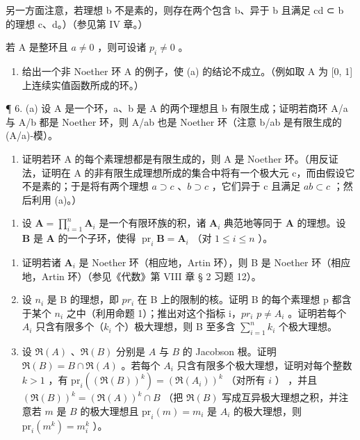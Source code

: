 另一方面注意，若理想 b 不是素的，则存在两个包含 b、异于 b 且满足 cd ⊂ b 的理想 c、d。）（参见第 IV 章。）

若 A 是整环且 \(a \neq 0\) ，则可设诸 \(p_{i} \neq 0\) 。

\begin{enumerate}
\def\labelenumi{(\alph{enumi})}
\setcounter{enumi}{1}
\tightlist
\item
  给出一个非 Noether 环 A 的例子，使 (a) 的结论不成立。（例如取 A 为 {[}0, 1{]} 上连续实值函数所成的环。）
\end{enumerate}

¶ 6. (a) 设 A 是一个环，a、b 是 A 的两个理想且 b 有限生成；证明若商环 A/a 与 A/b 都是 Noether 环，则 A/ab 也是 Noether 环（注意 b/ab 是有限生成的 (A/a)-模）。

\begin{enumerate}
\def\labelenumi{(\alph{enumi})}
\setcounter{enumi}{1}
\tightlist
\item
  证明若环 A 的每个素理想都是有限生成的，则 A 是 Noether 环。（用反证法，证明在 A 的非有限生成理想所成的集合中将有一个极大元 c，而由假设它不是素的；于是将有两个理想 \(a \supset c\) 、\(b \supset c\) ，它们异于 c 且满足 \(ab \subset c\) ；然后利用 (a)。）
\end{enumerate}

\begin{enumerate}
\def\labelenumi{\arabic{enumi}.}
\setcounter{enumi}{6}
\tightlist
\item
  设 \(\mathbf{A} = \prod_{i=1}^{n} \mathbf{A}_i\) 是一个有限环族的积，诸 \(\mathbf{A}_i\) 典范地等同于 \(\mathbf{A}\) 的理想。设 \(\mathbf{B}\) 是 \(\mathbf{A}\) 的一个子环，使得 \(\operatorname{pr}_i \mathbf{B} = \mathbf{A}_i\) （对 \(1 \leqslant i \leqslant n\) ）。
\end{enumerate}

\begin{enumerate}
\def\labelenumi{(\alph{enumi})}
\item
  证明若诸 \(\mathbf{A}_i\) 是 Noether 环（相应地，Artin 环），则 B 是 Noether 环（相应地，Artin 环）（参见《代数》第 VIII 章 § 2 习题 12）。
\item
  设 \(n_{i}\) 是 B 的理想，即 \(pr_{i}\) 在 B 上的限制的核。证明 B 的每个素理想 p 都含于某个 \(n_{i}\) 之中（利用命题 1）；推出对这个指标 i，\(pr_{i}\) \(p \neq A_{i}\) 。证明若每个 \(A_{i}\) 只含有限多个（\(k_{i}\) 个）极大理想，则 B 至多含 \(\sum_{i=1}^{n} k_{i}\) 个极大理想。
\item
  设 \(\Re(A)\) 、\(\Re(B)\) 分别是 \(A\) 与 \(B\) 的 Jacobson 根。证明 \(\Re(B) = B \cap \Re(A)\) 。若每个 \(A_i\) 只含有限多个极大理想，证明对每个整数 \(k > 1\) ，有 \(\mathrm{pr}_i((\Re(B))^k) = (\Re(A_i))^k\) （对所有 \(i\) ） ，并且 \((\Re(B))^k = (\Re(A))^k \cap B\) （把 \(\Re(B)\) 写成互异极大理想之积，并注意若 \(m\) 是 \(B\) 的极大理想且 \(\mathrm{pr}_i(m) = m_i\) 是 \(A_i\) 的极大理想，则 \(\mathrm{pr}_i(m^k) = m_i^k\) ）。
\end{enumerate}

